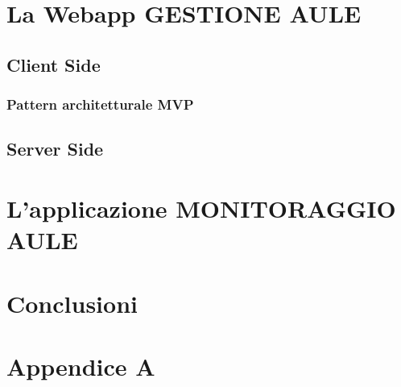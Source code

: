 \documentclass[a4paper,pt11,oneside]{book}
\begin{document}
\chapter{La Webapp GESTIONE AULE}

\section{Client Side}
\subsection{Pattern architetturale MVP}


\section{Server Side}


\chapter{L'applicazione MONITORAGGIO AULE}



\chapter{Conclusioni}

\chapter{Appendice A}


\end{document}
